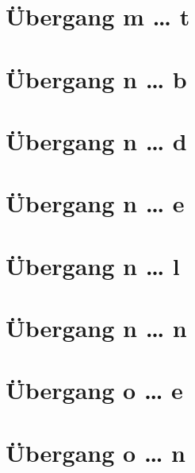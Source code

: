 \documentclass[a4paper,landscape]{article}
\begin{document}
\hspace*{-1ex}
\newpage

\section{Übergang m … t }

\hspace*{-1ex}
\newpage

\section{Übergang n … b }

\hspace*{-1ex}
\newpage

\section{Übergang n … d }

\hspace*{-1ex}
\newpage

\section{Übergang n … e }

\hspace*{-1ex}
\newpage

\section{Übergang n … l }

\hspace*{-1ex}
\newpage

\section{Übergang n … n }

\hspace*{-1ex}
\newpage

\section{Übergang o … e }

\hspace*{-1ex}
\newpage

\section{Übergang o … n }
\end{document}
